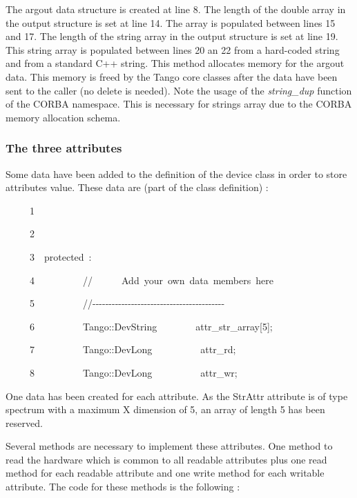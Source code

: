 The argout data structure is created at line 8. The length of the
double array in the output structure is set at line 14. The array
is populated between lines 15 and 17. The length of the string array
in the output structure is set at line 19. This string array is populated
between lines 20 an 22 from a hard-coded string and from a standard
C++ string. This method allocates memory for the argout
data. This memory is freed by the Tango core classes after the data
have been sent to the caller (no delete is needed). Note the usage
of the \emph{string\_dup} function of the CORBA
namespace. This is necessary for strings array due to the CORBA memory
allocation schema.


\subsubsection{The three attributes}

Some data have been added to the definition of the device class in
order to store attributes value. These data are (part of the class
definition) :


\begin{lyxcode}
~~~~~1~~

~~~~~2~~

~~~~~3~~protected~:~~~~~

~~~~~4~~~~~~~~~~//~~~~~~Add~your~own~data~members~here

~~~~~5~~~~~~~~~~//-{}-{}-{}-{}-{}-{}-{}-{}-{}-{}-{}-{}-{}-{}-{}-{}-{}-{}-{}-{}-{}-{}-{}-{}-{}-{}-{}-{}-{}-{}-{}-{}-{}-{}-{}-{}-{}-{}-{}-{}-

~~~~~6~~~~~~~~~~Tango::DevString~~~~~~~~attr\_str\_array{[}5{]};

~~~~~7~~~~~~~~~~Tango::DevLong~~~~~~~~~~attr\_rd;

~~~~~8~~~~~~~~~~Tango::DevLong~~~~~~~~~~attr\_wr;
\end{lyxcode}


One data has been created for each attribute. As the StrAttr attribute
is of type spectrum with a maximum X dimension of 5, an array of length
5 has been reserved.

Several methods are necessary to implement these attributes. One method
to read the hardware which is common to all \textquotedbl{}readable\textquotedbl{}
attributes plus one \textquotedbl{}read\textquotedbl{} method for
each readable attribute and one \textquotedbl{}write\textquotedbl{}
method for each writable attribute. The code for these methods is
the following :

